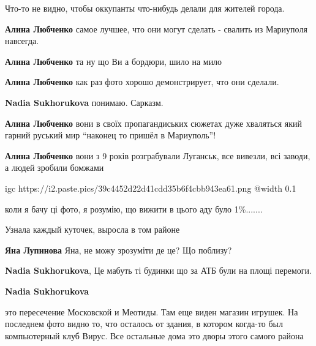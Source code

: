  
 
 
 
 

\qqSecCmt


Что-то не видно, чтобы оккупанты что-нибудь делали для жителей города.

\begin{itemize} %
\textbf{Алина Любченко} самое лучшее, что они могут сделать - свалить из Мариуполя навсегда.

\textbf{Алина Любченко} та ну що Ви а бордюри, шило на мило

\textbf{Алина Любченко} как раз фото хорошо демонстрирует, что они сделали.

\textbf{Nadia Sukhorukova} понимаю. Сарказм.

\textbf{Алина Любченко} вони в своїх пропагандиських сюжетах дуже хваляться який гарний руський мир \enquote{наконец то пришёл в Мариуполь}!

\textbf{Алина Любченко} вони з 9 років розграбували Луганськ, все вивезли, всі заводи, а людей зробили бомжами
\end{itemize} %


\ifcmt
  igc https://i2.paste.pics/39c4452d22d41cdd35b6f4cbb943ea61.png
  @width 0.1
\fi


коли я бачу ці фото, я розумію, що вижити в цього аду було 1\%.......


Узнала каждый куточек, выросла в том районе

\begin{itemize} %
\textbf{Яна Лупинова} Яна, не можу зрозуміти де це? Що поблизу?

\textbf{Nadia Sukhorukova}, Це мабуть ті будинки що за АТБ були на площі перемоги.

\textbf{Nadia Sukhorukova} 

это пересечение Московской и Меотиды. Там еще виден магазин игрушек. На
последнем фото видно то, что осталось от здания, в котором когда-то был
компьютерный клуб Вирус. Все остальные дома это дворы этого самого района

\end{itemize} %

